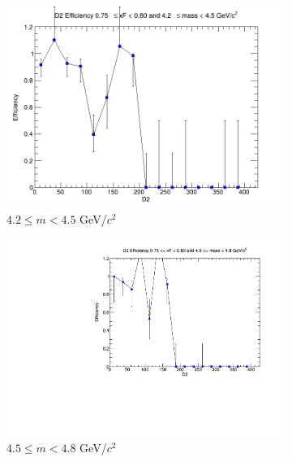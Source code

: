 \begin{figure}[p]
    \centering
    \begin{subfigure}[b]{0.32\textwidth}
        \centering
        \includegraphics[width=\textwidth]{./kTrackerEfficiencyPlots/D2_Efficiency_xF15_mass0.png}
        \caption{$4.2 \leq m < 4.5$ GeV/$c^2$}
        \label{fig:xF15_mass0}
    \end{subfigure}
    \hfill
    \begin{subfigure}[b]{0.32\textwidth}
        \centering
        \includegraphics[width=\textwidth]{./kTrackerEfficiencyPlots/D2_Efficiency_xF15_mass1.pdf}
        \caption{$4.5 \leq m < 4.8$ GeV/$c^2$}
        \label{fig:xF15_mass1}
    \end{subfigure}
    \hfill
    \begin{subfigure}[b]{0.32\textwidth}

\end{subfigure}
\end{figure}
